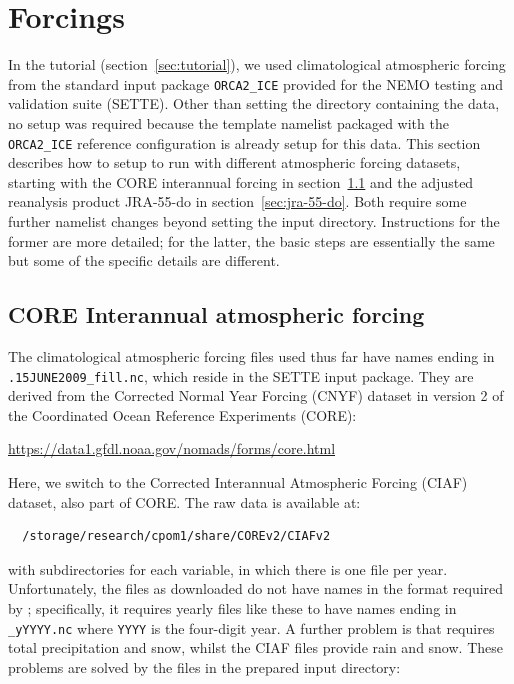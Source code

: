 \section{Forcings}
\label{sec:forcings}

In the tutorial (section~\ref{sec:tutorial}), we used climatological atmospheric forcing from the standard input package \verb|ORCA2_ICE| provided for the NEMO testing and validation suite (SETTE).
Other than setting the directory containing the data, no setup was required because the template namelist packaged with the \verb|ORCA2_ICE| reference configuration is already setup for this data.
This section describes how to setup \NEMOSIcu{} to run with different atmospheric forcing datasets, starting with the CORE interannual forcing in section~\ref{sec:core-ciaf} and the adjusted reanalysis product \mbox{JRA-55-do} in section~\ref{sec:jra-55-do}.
Both require some further namelist changes beyond setting the input directory.
Instructions for the former are more detailed; for the latter, the basic steps are essentially the same but some of the specific details are different.


\subsection{CORE Interannual atmospheric forcing}
\label{sec:core-ciaf}

The climatological atmospheric forcing files used thus far have names ending in \verb|.15JUNE2009_fill.nc|, which reside in the SETTE input package.
They are derived from the Corrected Normal Year Forcing (CNYF) dataset in version 2 of the Coordinated Ocean Reference Experiments (CORE):

\begin{center}
    \url{https://data1.gfdl.noaa.gov/nomads/forms/core.html}
\end{center}

Here, we switch to the Corrected Interannual Atmospheric Forcing (CIAF) dataset, also part of CORE.
The raw data is available at:

\begin{verbatim}
  /storage/research/cpom1/share/COREv2/CIAFv2
\end{verbatim}

with subdirectories for each variable, in which there is one file per year.
Unfortunately, the files as downloaded do not have names in the format required by \NEMOSIcu{}; specifically, it requires yearly files like these to have names ending in \verb|_yYYYY.nc| where \verb|YYYY| is the four-digit year.
A further problem is that \NEMOSIcu{} requires total precipitation and snow, whilst the CIAF files provide rain and snow.
These problems are solved by the files in the prepared input directory:

